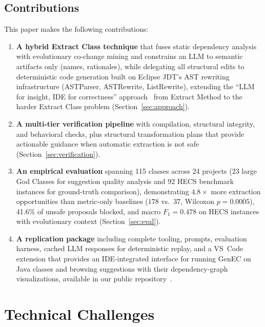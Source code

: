 \documentclass[sigconf]{acmart}
\begin{document}
\subsection{Contributions}
\label{sec:contributions}

This paper makes the following contributions:
\begin{enumerate}
  \item \textbf{A hybrid Extract Class technique} that fuses static dependency
        analysis with evolutionary co-change mining and constrains an LLM to
        semantic artifacts only (names, rationales), while delegating all
        structural edits to deterministic code generation built on Eclipse JDT's
        AST rewriting infrastructure (ASTParser, ASTRewrite, ListRewrite),
        extending the ``LLM for insight, IDE for correctness'' approach~\cite{Pomian2024EMAssist,Dilhara2024PyCraft}
        from Extract Method to the harder Extract Class problem
        (Section~\ref{sec:approach}).
  \item \textbf{A multi-tier verification pipeline} with compilation,
        structural integrity, and behavioral checks, plus structural
        transformation plans that provide actionable guidance when automatic
        extraction is not safe (Section~\ref{sec:verification}).
  \item \textbf{An empirical evaluation} spanning 115 classes across 24
        projects (23 large God Classes for suggestion quality analysis and 92
        HECS benchmark instances for ground-truth comparison), demonstrating
        $4.8\times$ more extraction opportunities than metric-only baselines
        ($178$ vs.\ $37$, Wilcoxon $p{=}0.0005$), 41.6\% of unsafe proposals
        blocked, and macro $F_1{=}0.478$ on HECS instances with evolutionary
        context (Section~\ref{sec:eval}).
  \item \textbf{A replication package} including complete tooling, prompts,
        evaluation harness, cached LLM responses for deterministic replay, and
        a VS~Code extension that provides an IDE-integrated interface for
        running GenEC on Java classes and browsing suggestions with their
        dependency-graph visualizations, available in our public
        repository~\cite{Tomar2025GenEC}.
\end{enumerate}

\section{Technical Challenges}
\label{sec:challenges}
\end{document}
